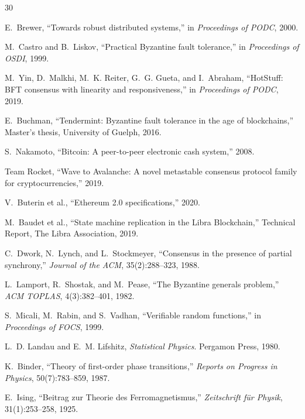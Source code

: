 \documentclass[11pt,a4paper]{article}
\begin{document}
\begin{thebibliography}{30}

E.~Brewer, ``Towards robust distributed systems,'' in
\textit{Proceedings of PODC}, 2000.

M.~Castro and B.~Liskov, ``Practical Byzantine fault tolerance,'' in
\textit{Proceedings of OSDI}, 1999.

M.~Yin, D.~Malkhi, M.~K. Reiter, G.~G. Gueta, and I.~Abraham, ``HotStuff: BFT
consensus with linearity and responsiveness,'' in \textit{Proceedings of PODC}, 2019.

E.~Buchman, ``Tendermint: Byzantine fault tolerance in the age of blockchains,''
Master's thesis, University of Guelph, 2016.

S.~Nakamoto, ``Bitcoin: A peer-to-peer electronic cash system,'' 2008.

Team Rocket, ``Wave to Avalanche: A novel metastable consensus protocol family
for cryptocurrencies,'' 2019.

V.~Buterin et al., ``Ethereum 2.0 specifications,'' 2020.

M.~Baudet et al., ``State machine replication in the Libra Blockchain,''
Technical Report, The Libra Association, 2019.

C.~Dwork, N.~Lynch, and L.~Stockmeyer, ``Consensus in the presence of partial
synchrony,'' \textit{Journal of the ACM}, 35(2):288--323, 1988.

L.~Lamport, R.~Shostak, and M.~Pease, ``The Byzantine generals problem,''
\textit{ACM TOPLAS}, 4(3):382--401, 1982.

S.~Micali, M.~Rabin, and S.~Vadhan, ``Verifiable random functions,'' in
\textit{Proceedings of FOCS}, 1999.

L.~D. Landau and E.~M. Lifshitz, \textit{Statistical Physics}. Pergamon Press, 1980.

K.~Binder, ``Theory of first-order phase transitions,''
\textit{Reports on Progress in Physics}, 50(7):783--859, 1987.

E.~Ising, ``Beitrag zur Theorie des Ferromagnetismus,''
\textit{Zeitschrift f{\"u}r Physik}, 31(1):253--258, 1925.


\end{thebibliography}
\end{document}
